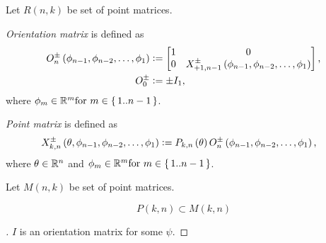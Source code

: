 \documentclass[stu, babel, american, biblatex, a4paper, draftall]{apa7}
\begin{document}
\begin{definition}\label{SetPositionMatrix}
    Let $R\left(n,k\right)$ be set of point matrices.
\end{definition}
\begin{definition}\label{OrientationMatrix}
    \textit{Orientation matrix} is defined as
    \begin{align*}
        O^\pm_n\left(\phi_{n-1},\phi_{n-2},\dots,\phi_1\right) & \vcentcolon=
        \begin{bmatrix}
            1 & 0                                                             \\
            0 & X^\pm_{+1,n-1}\left(\phi_{n-1},\phi_{n-2},\dots,\phi_1\right) \\
        \end{bmatrix}\text{,}                                              \\
        O^\pm_0                                                & \vcentcolon= \pm I_1\text{,}
    \end{align*}
    where $\phi_m\in\mathbb{R}^m \text{for } m\in\set{1..n-1}$.
\end{definition}
\begin{definition}\label{PointMatrix}
    \textit{Point matrix} is defined as
    \begin{align*}
        X^\pm_{k,n}\left(\theta,\phi_{n-1},\phi_{n-2},\dots,\phi_1\right) & \vcentcolon=
        P_{k,n}\left(\theta\right)
        O^\pm_n\left(\phi_{n-1},\phi_{n-2},\dots,\phi_1\right)\text{,}
    \end{align*}
    where $\theta\in\mathbb{R}^n$ and $\phi_m\in\mathbb{R}^m \text{for } m\in\set{1..n-1}$.
\end{definition}
\begin{definition}\label{SetPointMatrix}
    Let $M\left(n,k\right)$ be set of point matrices.
\end{definition}
\begin{corollary}\label{PointPositionSubset}
    \begin{equation*}
        P\left(k,n\right)\subset M\left(k,n\right)
    \end{equation*}
\end{corollary}
\begin{proof}[]
    \skipped

    $I$ is an orientation matrix for some $\psi$.
\end{proof}
\end{document}
